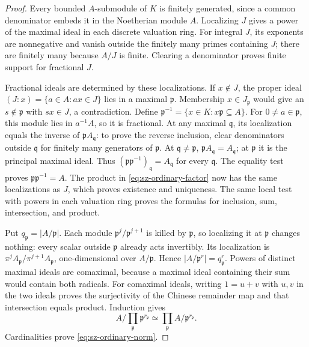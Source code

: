 \documentclass[11pt,a4paper]{article}
\theoremstyle{definition}\newtheorem{definition}[theorem]{Definition}
\begin{document}
\begin{proof}
Every bounded \(A\)-submodule of \(K\) is finitely generated, since
a common denominator embeds it in the Noetherian module \(A\).
Localizing \(J\) gives a power of the maximal ideal in each discrete
valuation ring. For integral \(J\), its exponents are nonnegative
and vanish outside the finitely many primes containing \(J\);
there are finitely many because \(A/J\) is finite. Clearing a
denominator proves finite support for fractional \(J\).

Fractional ideals are determined by these localizations. If \(x\notin J\),
the proper ideal \((J:x)=\{a\in A:ax\in J\}\) lies in a maximal
\(\mathfrak p\). Membership \(x\in J_{\mathfrak p}\) would give an
\(s\notin\mathfrak p\) with \(sx\in J\), a contradiction.
Define \(\mathfrak p^{-1}=\{x\in K:x\mathfrak p\subseteq A\}\).
For \(0\ne a\in\mathfrak p\), this module lies in \(a^{-1}A\), so it
is fractional. At any maximal \(\mathfrak q\), its localization equals
the inverse of \(\mathfrak p A_{\mathfrak q}\): to prove the reverse
inclusion, clear denominators outside \(\mathfrak q\) for finitely
many generators of \(\mathfrak p\).
At \(\mathfrak q\ne\mathfrak p\), \(\mathfrak p A_{\mathfrak q}=A_{\mathfrak q}\);
at \(\mathfrak p\) it is the principal maximal ideal. Thus
\((\mathfrak p\mathfrak p^{-1})_{\mathfrak q}=A_{\mathfrak q}\)
for every \(\mathfrak q\). The equality test proves
\(\mathfrak p\mathfrak p^{-1}=A\).
The product in \eqref{eq:sz-ordinary-factor} now has the same
localizations as \(J\), which proves existence and uniqueness.
The same local test with powers in each valuation ring proves the
formulas for inclusion, sum, intersection, and product.

Put \(q_{\mathfrak p}=|A/\mathfrak p|\). Each module
\(\mathfrak p^j/\mathfrak p^{j+1}\) is killed by \(\mathfrak p\), so
localizing it at \(\mathfrak p\) changes nothing: every scalar
outside \(\mathfrak p\) already acts invertibly. Its localization
is \(\pi^j A_{\mathfrak p}/\pi^{j+1}A_{\mathfrak p}\), one-dimensional
over \(A/\mathfrak p\). Hence \(|A/\mathfrak p^r|=q_{\mathfrak p}^r\).
Powers of distinct maximal ideals are comaximal, because a maximal
ideal containing their sum would contain both radicals. For comaximal
ideals, writing \(1=u+v\) with \(u,v\) in the two ideals proves the
surjectivity of the Chinese remainder map and that intersection
equals product. Induction gives
\[
 A/\prod_{\mathfrak p}\mathfrak p^{r_{\mathfrak p}}
 \simeq\prod_{\mathfrak p}A/\mathfrak p^{r_{\mathfrak p}}.
\]
Cardinalities prove \eqref{eq:sz-ordinary-norm}.
\end{proof}
\end{document}
